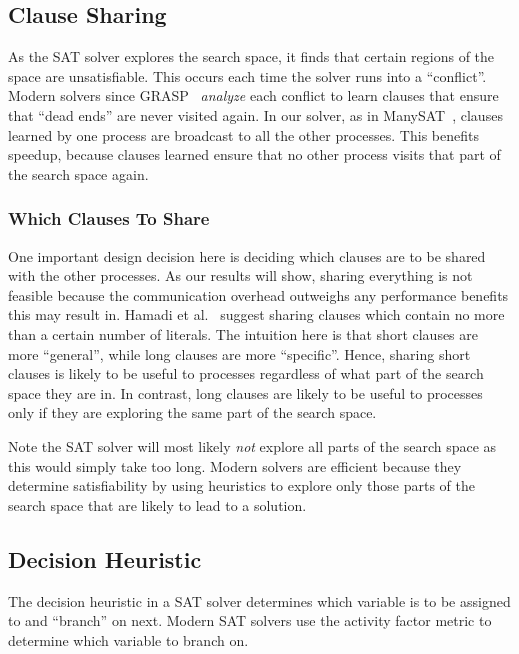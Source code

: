 \documentclass[letterpaper, compsoc, conference]{IEEEtran}
\begin{document}
\subsection{Clause Sharing}

As the SAT solver explores the search space, it finds that certain regions of
the space are unsatisfiable. This occurs each time the solver runs into a
``conflict''. Modern solvers since GRASP~\cite{Silva1997GRASP} \emph{analyze} each
conflict to learn clauses that ensure that ``dead ends'' are never visited
again. In our solver, as in ManySAT~\cite{ManySAT}, clauses learned by one
process are broadcast to all the other processes. This benefits speedup,
because clauses learned ensure that no other process visits that part 
of the search space again.

\subsubsection{Which Clauses To Share}

One important design decision here is deciding which clauses are to be shared
with the other processes. As our results will show, sharing everything is not
feasible because the communication overhead outweighs any performance benefits
this may result in. Hamadi et al.~\cite{Hamadi} suggest sharing clauses which
contain no more than a certain number of literals. The intuition here is that
short clauses are more ``general'', while long clauses are more ``specific''.
Hence, sharing short clauses is likely to be useful to processes regardless of
what part of the search space they are in. In contrast, long clauses are likely
to be useful to processes only if they are exploring the same part of the
search space. 

Note the SAT solver will most likely \textit{not} explore all parts of the
search space as this would simply take too long. Modern solvers are efficient
because they determine satisfiability by using heuristics to explore only
those parts of the search space that are likely to lead to a solution.

\subsection{Decision Heuristic} 
\label{sec:decheu}

The decision heuristic in a SAT solver determines which variable is to be
assigned to and ``branch'' on next. Modern SAT solvers use the activity factor
metric to determine which variable to branch on.
\end{document}
